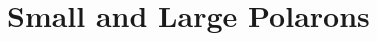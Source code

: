 \documentclass[11pt, xcolor=dvipsnames, aspectratio=43]{beamer}
\newcommand{\oper}[1]{\hat{#1}}
\renewcommand{\vec}[1]{\mathbf{\boldsymbol{#1}}}
\newcommand{\adjoint}[1]{#1^\dagger}
\newcommand{\adjop}[1]{\adjoint{\oper{#1}}}
\begin{document}
\section{Small and Large Polarons}
%
%
\end{document}
